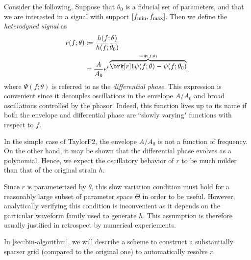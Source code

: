 Consider the following.
Suppose that $\theta_0$ is a fiducial set of parameters, and that we are interested in a signal with support $[f_{\text{min}}, f_{\text{max}}]$. Then we define the \textit{heterodyned signal} as
\begin{align*}
r(f;\theta) &\defn \frac{h(f;\theta)}{h(f; \theta_0)} \\
&= \frac{A}{A_0} e^{i \overbrace{\brk[r]1{\psi(f;\theta) - \psi(f;\theta_0)}}^{\defn \Psi(f;\theta)}},
\end{align*}
where $\Psi(f;\theta)$ is referred to as the \textit{differential phase}.
This expression is convenient since it decouples oscillations in the envelope $A/A_0$ and broad oscillations controlled by the phasor.
Indeed, this function lives up to its name if both the envelope and differential phase are ``slowly varying" functions with respect to $f$.
\begin{example}[TaylorF2]\label{}
In the simple case of TaylorF2, the envelope $A/A_0$ is not a function of frequency. On the other hand, it may be shown that the differential phase evolves as a polynomial. Hence, we expect the oscillatory behavior of $r$ to be much milder than that of the original strain $h$.
\end{example}
\begin{remark}[]\label{}
Since $r$ is parameterized by $\theta$, this slow variation condition must hold for a reasonably large subset of parameter space $\Theta$ in order to be useful.
However, analytically verifying this condition is inconvenient as it depends on the particular waveform family used to generate $h$.
This assumption is therefore usually justified in retrospect by numerical experiements.
\end{remark}

In \cref{sec:bin-algorithm}, we will describe a scheme to construct a substantially sparser grid (compared to the original one) to automatically resolve $r$.




